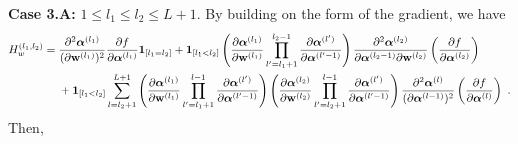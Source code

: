 {\bf Case 3.A:} $1 \leq l_1 \leq l_2 \leq L+1$. By building on the form of the gradient, we have 
\begin{align*}
H_{w}^{(l_1,l_2)} & = \frac{\partial^2 \boldsymbol{\alpha}^{(l_1)}}{(\partial \mathbf{w}^{(l_1)})^2} \frac{\partial f}{\partial \boldsymbol{\alpha}^{(l_1)}} \bm{1}_{[l_1 =l_2]} +  \bm{1}_{[l_1 <l_2]}\left( \frac{\partial \boldsymbol{\alpha}^{(l_1)}}{\partial \mathbf{w}^{(l_1)}}  \prod_{l'=l_1+1}^{l_2-1} \frac{\partial \boldsymbol{\alpha}^{(l')}}{\partial \boldsymbol{\alpha}^{(l'-1)}} \right) \frac{\partial^2 \boldsymbol{\alpha}^{(l_2)}}{\partial \boldsymbol{\alpha}^{(l_2-1)} \partial \mathbf{w}^{(l_2)}} \left(\frac{\partial f}{\partial \boldsymbol{\alpha}^{(l_2)}} \right) \\
& ~~~~ + \bm{1}_{[l_1 <l_2]}\sum_{l=l_2+1}^{L+1} \left( \frac{\partial \boldsymbol{\alpha}^{(l_1)}}{\partial \mathbf{w}^{(l_1)}} \prod_{l'=l_1+1}^{l-1} \frac{\partial \boldsymbol{\alpha}^{(l')}}{\partial \boldsymbol{\alpha}^{(l'-1)}} \right)  \left( \frac{\partial \boldsymbol{\alpha}^{(l_2)}}{\partial \mathbf{w}^{(l_2)}} \prod_{l'=l_2+1}^{l-1} \frac{\partial \boldsymbol{\alpha}^{(l')}}{\partial \boldsymbol{\alpha}^{(l'-1)}} \right) \frac{\partial^2 \boldsymbol{\alpha}^{(l)}}{(\partial \boldsymbol{\alpha}^{(l-1)})^2}  \left(\frac{\partial f}{\partial \boldsymbol{\alpha}^{(l)}} \right) ~. 
\end{align*}
Then,
